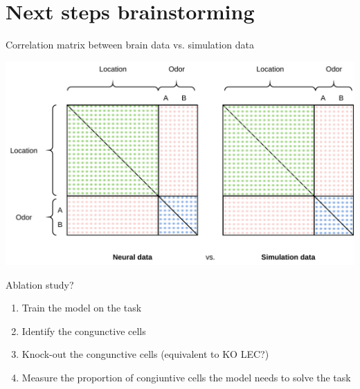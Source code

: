 \documentclass[bigger]{beamer}
\begin{document}
\section{Next steps brainstorming}
\label{sec:orgda2a4da}
\begin{frame}[label={sec:orgb4b5614}]{Correlation matrix between brain data vs. simulation data}
\begin{center}
\includegraphics[width=.9\linewidth]{img/activation-matrix.drawio.pdf}
\end{center}
\end{frame}
\begin{frame}[label={sec:org49097d1}]{Ablation study?}
\begin{enumerate}
\item Train the model on the task
\item Identify the congunctive cells
\item Knock-out the congunctive cells (equivalent to KO LEC?)
\item Measure the proportion of congiuntive cells the model needs to solve the task
\end{enumerate}
\end{frame}
\end{document}
